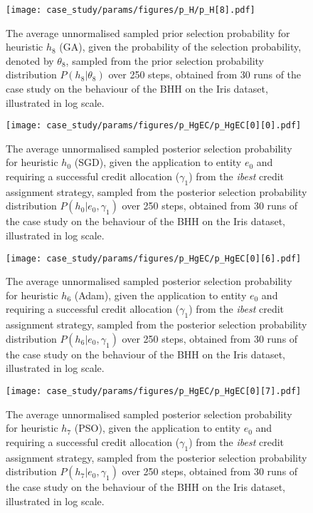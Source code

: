 \begin{figure}[htpb]
	\centering
	\texttt{[image: case\_study/params/figures/p\_H/p\_H[8].pdf]}
	\caption{The average unnormalised sampled prior selection probability for heuristic $h_{8}$ (\acs{GA}), given the probability of the selection probability, denoted by $\theta_{8}$, sampled from the prior selection probability distribution $P(h_{8} \vert \theta_{8})$ over 250 steps, obtained from 30 runs of the case study on the behaviour of the \acs{BHH} on the Iris dataset, illustrated in log scale.}
	\label{fig:results:case_study:p_H:8}
\end{figure}


\begin{figure}[htpb]
	\centering
	\texttt{[image: case\_study/params/figures/p\_HgEC/p\_HgEC[0][0].pdf]}
	\caption{The average unnormalised sampled posterior selection probability for heuristic $h_{0}$ (\acs{SGD}), given the application to entity $e_{0}$ and requiring a successful credit allocation ($\gamma_{1}$) from the \textit{ibest} credit assignment strategy, sampled from the posterior selection probability distribution $P(h_{0} \vert e_{0}, \gamma_{1})$ over 250 steps, obtained from 30 runs of the case study on the behaviour of the \acs{BHH} on the Iris dataset, illustrated in log scale.}
	\label{fig:results:case_study:p_HgEC:0:0}
\end{figure}


\begin{figure}[htpb]
	\centering
	\texttt{[image: case\_study/params/figures/p\_HgEC/p\_HgEC[0][6].pdf]}
	\caption{The average unnormalised sampled posterior selection probability for heuristic $h_{6}$ (\acs{Adam}), given the application to entity $e_{0}$ and requiring a successful credit allocation ($\gamma_{1}$) from the \textit{ibest} credit assignment strategy, sampled from the posterior selection probability distribution $P(h_{6} \vert e_{0}, \gamma_{1})$ over 250 steps, obtained from 30 runs of the case study on the behaviour of the \acs{BHH} on the Iris dataset, illustrated in log scale.}
	\label{fig:results:case_study:p_HgEC:0:6}
\end{figure}

\begin{figure}[htpb]
	\centering
	\texttt{[image: case\_study/params/figures/p\_HgEC/p\_HgEC[0][7].pdf]}
	\caption{The average unnormalised sampled posterior selection probability for heuristic $h_{7}$ (\acs{PSO}), given the application to entity $e_{0}$ and requiring a successful credit allocation ($\gamma_{1}$) from the \textit{ibest} credit assignment strategy, sampled from the posterior selection probability distribution $P(h_{7} \vert e_{0}, \gamma_{1})$ over 250 steps, obtained from 30 runs of the case study on the behaviour of the \acs{BHH} on the Iris dataset, illustrated in log scale.}
	\label{fig:results:case_study:p_HgEC:0:7}
\end{figure}

